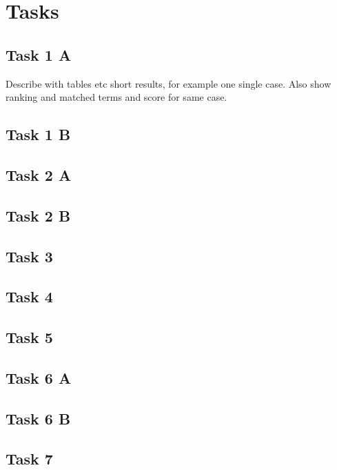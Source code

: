 \section{Tasks}

\subsection{Task 1 A}
Describe with tables etc short results, for example one single case.
Also show ranking and matched terms and score for same case.

\subsection{Task 1 B}

\subsection{Task 2 A}

\subsection{Task 2 B}

\subsection{Task 3}

\subsection{Task 4}

\subsection{Task 5}

\subsection{Task 6 A}

\subsection{Task 6 B}

\subsection{Task 7}

